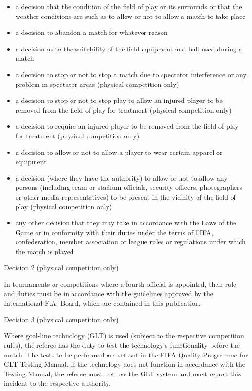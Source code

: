 \begin{itemize}
\item a decision that the condition of the field of play or its surrounds or that the weather conditions are such as to allow or not to allow a match to take place
\item a decision to abandon a match for whatever reason
\item a decision as to the suitability of the field equipment and ball used during a match
\item a decision to stop or not to stop a match due to spectator interference or any problem in spectator areas (physical competition only)
\item a decision to stop or not to stop play to allow an injured player to be removed from the field of play for treatment (physical competition only)
\item a decision to require an injured player to be removed from the field of play for treatment (physical competition only)
\item a decision to allow or not to allow a player to wear certain apparel or equipment 
\item a decision (where they have the authority) to allow or not to allow any persons (including team or stadium officials, security officers, photographers or other media representatives) to be present in the vicinity of the field of play (physical competition only)
\item any other decision that they may take in accordance with the Laws of the Game or in conformity with their duties under the terms of FIFA, confederation, member association or league rules or regulations under which the match is played 
\end{itemize}

\bigskip

Decision 2 (physical competition only)

In tournaments or competitions where a fourth official is appointed, their role and duties must be in accordance with the guidelines approved by the International F.A. Board, which are contained in this publication.

\bigskip

Decision 3 (physical competition only)

Where goal-line technology (GLT) is used (subject to the respective competition rules), the referee has the duty to test the technology's functionality before the match. The tests to be performed are set out in the FIFA Quality Programme for GLT Testing Manual. If the technology does not function in accordance with the Testing Manual, the referee must not use the GLT system and must report this incident to the respective authority.
